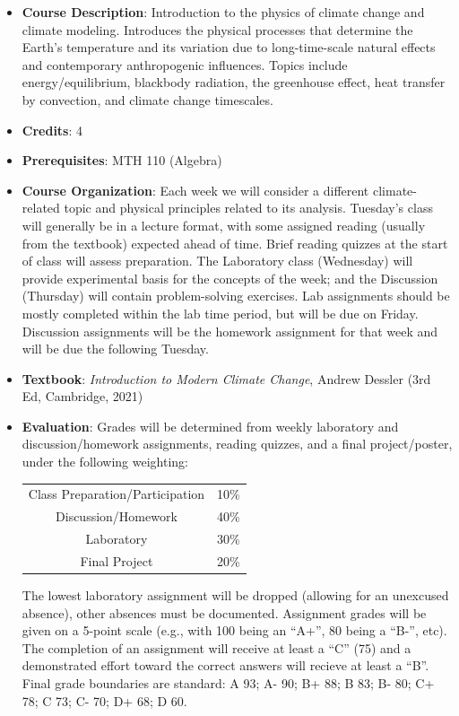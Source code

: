 \documentclass{article}
\begin{document}
\vspace{0.5cm}
\begin{itemize}
\item[] {\bf Course Description}: Introduction to the physics of climate change and climate modeling. Introduces the physical processes that determine the Earth's temperature and its variation due to long-time-scale natural effects and contemporary anthropogenic influences. Topics include energy/equilibrium, blackbody radiation, the greenhouse effect, heat transfer by convection, and climate change timescales.

\item[] {\bf Credits}: 4

\item[]{\bf Prerequisites}: MTH 110 (Algebra)

\item[] {\bf Course Organization}: Each week we will consider a different climate-related topic and physical principles related to its analysis. Tuesday's class will generally be in a lecture format, with some assigned reading (usually from the textbook) expected ahead of time. Brief reading quizzes at the start of class will assess preparation. The Laboratory class (Wednesday) will provide experimental basis for the concepts of the week;  and the Discussion (Thursday) will contain problem-solving exercises. Lab assignments should be mostly completed within the lab time period, but will be due on Friday.  Discussion assignments will be the homework assignment for that week and will be due the following Tuesday.  %


\item[]{\bf Textbook}: {\em Introduction to Modern Climate Change}, Andrew Dessler (3rd Ed, Cambridge, 2021)

    
\item[] {\bf Evaluation}: Grades will be determined from weekly laboratory and discussion/homework assignments, reading quizzes, and a final project/poster, under the following weighting:
    \begin{center}
    \begin{tabular}{cc}
    Class Preparation/Participation & 10\%\\
    Discussion/Homework & 40\%\\
    Laboratory & 30\% \\
    Final Project & 20\%
    \end{tabular}
    \end{center}
The lowest laboratory assignment will be dropped (allowing for an unexcused absence), other absences must be documented. Assignment grades will be given on a 5-point scale (e.g., with 100 being an ``A+'', 80 being a ``B-'', etc). The completion of an assignment will receive at least a ``C'' (75) and a demonstrated effort toward the correct answers will recieve at least a ``B''. Final grade boundaries are standard: A 93; A-  90; B+ 88; B 83; B- 80; C+ 78; C 73; C- 70; D+ 68; D 60.


\end{itemize}
\end{document}
